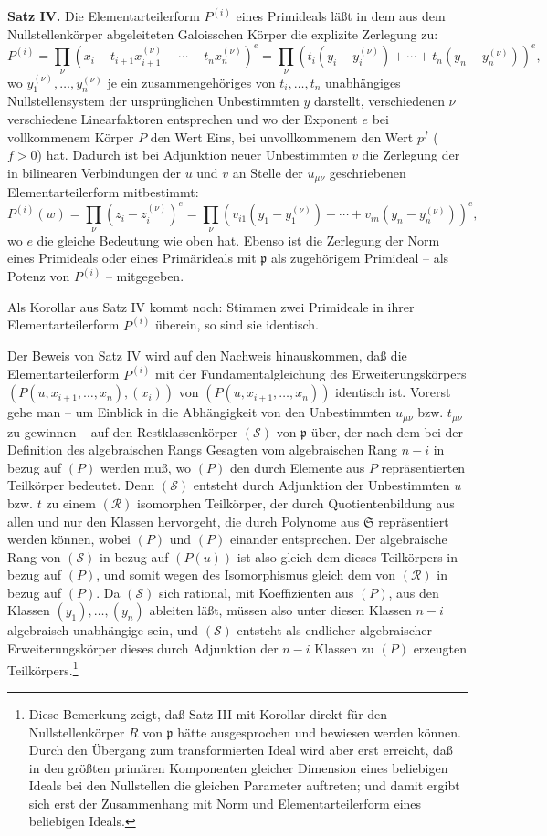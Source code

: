 \documentclass[11pt]{article}
\providecommand{\frakS}{\mathfrak S}
\providecommand{\frakp}{\mathfrak p}
\begin{document}
\textbf{Satz IV.} Die Elementarteilerform $P^{(i)}$ eines Primideals läßt in dem aus dem Nullstellenkörper abgeleiteten Galoisschen Körper die explizite Zerlegung zu:
\[
 P^{(i)}=\prod_\nu (x_i-t_{i+1}x_{i+1}^{(\nu)}-\cdots-t_nx_n^{(\nu)})^e
 =\prod_\nu (t_i(y_i-y_i^{(\nu)})+\cdots+t_n(y_n-y_n^{(\nu)}))^e,
\]
wo $y_1^{(\nu)},\ldots,y_n^{(\nu)}$ je ein zusammengehöriges von $t_i,\ldots,t_n$ unabhängiges Nullstellensystem der ursprünglichen Unbestimmten $y$ darstellt, verschiedenen $\nu$ verschiedene Linearfaktoren entsprechen und wo der Exponent $e$ bei vollkommenem Körper $P$ den Wert Eins, bei unvollkommenem den Wert $p^f$ ($f>0$) hat. Dadurch ist bei Adjunktion neuer Unbestimmten $v$ die Zerlegung der in bilinearen Verbindungen der $u$ und $v$ an Stelle der $u_{\mu\nu}$ geschriebenen Elementarteilerform mitbestimmt:
\[
 P^{(i)}(w)=\prod_\nu (z_i-z_i^{(\nu)})^e
 =\prod_\nu (v_{i1}(y_1-y_1^{(\nu)})+\cdots+v_{in}(y_n-y_n^{(\nu)}))^e,
\]
wo $e$ die gleiche Bedeutung wie oben hat. Ebenso ist die Zerlegung der Norm eines Primideals oder eines Primärideals mit $\frakp$ als zugehörigem Primideal -- als Potenz von $P^{(i)}$ -- mitgegeben.

Als Korollar aus Satz IV kommt noch: Stimmen zwei Primideale in ihrer Elementarteilerform $P^{(i)}$ überein, so sind sie identisch.

Der Beweis von Satz IV wird auf den Nachweis hinauskommen, daß die Elementarteilerform $P^{(i)}$ mit der Fundamentalgleichung des Erweiterungskörpers $(P(u,x_{i+1},\ldots,x_n),(x_i))$ von $(P(u,x_{i+1},\ldots,x_n))$ identisch ist. Vorerst gehe man -- um Einblick in die Abhängigkeit von den Unbestimmten $u_{\mu\nu}$ bzw. $t_{\mu\nu}$ zu gewinnen -- auf den Restklassenkörper $(\mathcal S)$ von $\frakp$ über, der nach dem bei der Definition des algebraischen Rangs Gesagten vom algebraischen Rang $n-i$ in bezug auf $(P)$ werden muß, wo $(P)$ den durch Elemente aus $P$ repräsentierten Teilkörper bedeutet. Denn $(\mathcal S)$ entsteht durch Adjunktion der Unbestimmten $u$ bzw. $t$ zu einem $(\mathcal R)$ isomorphen Teilkörper, der durch Quotientenbildung aus allen und nur den Klassen hervorgeht, die durch Polynome aus $\frakS$ repräsentiert werden können, wobei $(P)$ und $(P)$ einander entsprechen. Der algebraische Rang von $(\mathcal S)$ in bezug auf $(P(u))$ ist also gleich dem dieses Teilkörpers in bezug auf $(P)$, und somit wegen des Isomorphismus gleich dem von $(\mathcal R)$ in bezug auf $(P)$. Da $(\mathcal S)$ sich rational, mit Koeffizienten aus $(P)$, aus den Klassen $(y_1),\ldots,(y_n)$ ableiten läßt, müssen also unter diesen Klassen $n-i$ algebraisch unabhängige sein, und $(\mathcal S)$ entsteht als endlicher algebraischer Erweiterungskörper dieses durch Adjunktion der $n-i$ Klassen zu $(P)$ erzeugten Teilkörpers.\footnote{Diese Bemerkung zeigt, daß Satz III mit Korollar direkt für den Nullstellenkörper $R$ von $\frakp$ hätte ausgesprochen und bewiesen werden können. Durch den Übergang zum transformierten Ideal wird aber erst erreicht, daß in den größten primären Komponenten gleicher Dimension eines beliebigen Ideals bei den Nullstellen die gleichen Parameter auftreten; und damit ergibt sich erst der Zusammenhang mit Norm und Elementarteilerform eines beliebigen Ideals.}
\end{document}
